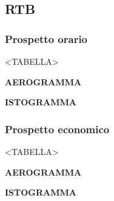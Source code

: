\subsection{RTB}

\subsubsection{Prospetto orario}

<TABELLA>


\textbf{AEROGRAMMA}


\textbf{ISTOGRAMMA}

\subsubsection{Prospetto economico}

<TABELLA>


\textbf{AEROGRAMMA}


\textbf{ISTOGRAMMA}

